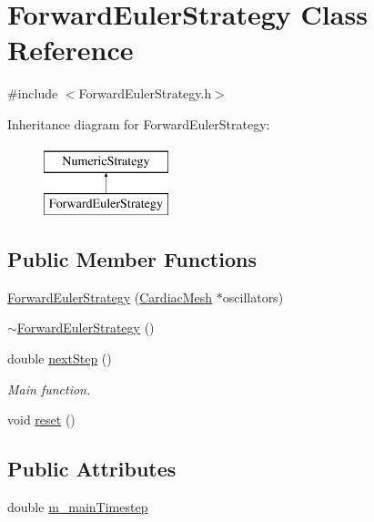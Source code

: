\hypertarget{class_forward_euler_strategy}{\section{Forward\+Euler\+Strategy Class Reference}
\label{class_forward_euler_strategy}
}


{\ttfamily \#include $<$Forward\+Euler\+Strategy.\+h$>$}

Inheritance diagram for Forward\+Euler\+Strategy\+:\begin{figure}[H]
\begin{center}
\leavevmode
\includegraphics[height=2.000000cm]{class_forward_euler_strategy}
\end{center}
\end{figure}
\subsection*{Public Member Functions}
\begin{DoxyCompactItemize}
\item 
\hyperlink{class_forward_euler_strategy_a34072c0f458fb7946733717cf05956a4}{Forward\+Euler\+Strategy} (\hyperlink{class_cardiac_mesh}{Cardiac\+Mesh} $\ast$oscillators)
\item 
\hyperlink{class_forward_euler_strategy_a2c712bdc098b10499d8033b14302526c}{$\sim$\+Forward\+Euler\+Strategy} ()
\item 
double \hyperlink{class_forward_euler_strategy_a3a382585c2d87ffaf370c07c37737a28}{next\+Step} ()
\begin{DoxyCompactList}\small\item\em Main function. \end{DoxyCompactList}\item 
void \hyperlink{class_forward_euler_strategy_aedd8186805189522eebfafce55617bb9}{reset} ()
\end{DoxyCompactItemize}
\subsection*{Public Attributes}
\begin{DoxyCompactItemize}
\item 
double \hyperlink{class_forward_euler_strategy_aa7cb67aa11fb16d4a76c1944ad3dbbc4}{m\+\_\+main\+Timestep}
\end{DoxyCompactItemize}


